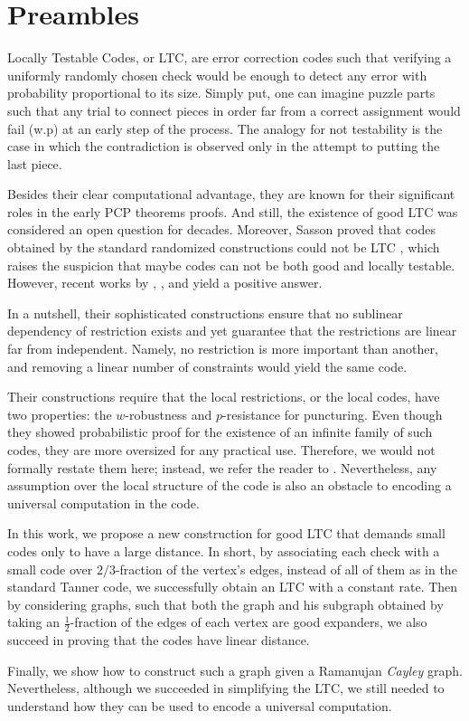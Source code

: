 \section{Preambles}

Locally Testable Codes, or LTC, are error correction codes such that verifying a uniformly randomly chosen check would be enough to detect any error with probability proportional to its size. Simply put, one can imagine puzzle parts such that any trial to connect pieces in order far from a correct assignment would fail (w.p) at an early step of the process. The analogy for not testability is the case in which the contradiction is observed only in the attempt to putting the last piece.     

Besides their clear computational advantage, they are known for their significant roles in the early PCP theorems proofs. And still, the existence of good LTC was considered an open question for decades. Moreover, Sasson proved that codes obtained by the standard randomized constructions could not be LTC \cite{Sasson}, which raises the suspicion that maybe codes can not be both good and locally testable. However, recent works by \cite{Dinur}, \cite{Pavel}, and \cite{leverrier2022quantum} yield a positive answer.

In a nutshell, their sophisticated constructions ensure that no sublinear dependency of restriction exists and yet guarantee that the restrictions are linear far from independent. Namely, no restriction is more important than another, and removing a linear number of constraints would yield the same code.  

Their constructions require that the local restrictions, or the local codes, have two properties: the $w$-robustness and $p$-resistance for puncturing. Even though they showed probabilistic proof for the existence of an infinite family of such codes, they are more oversized for any practical use. Therefore, we would not formally restate them here; instead, we refer the reader to \cite{leverrier2022quantum}. Nevertheless, any assumption over the local structure of the code is also an obstacle to encoding a universal computation in the code. 

In this work, we propose a new construction for good LTC that demands small codes only to have a large distance. In short, by associating each check with a small code over $2/3$-fraction of the vertex's edges, instead of all of them as in the standard Tanner code, we successfully obtain an LTC with a constant rate. Then by considering graphs, such that both the graph and his subgraph obtained by taking an $\frac{1}{2}$-fraction of the edges of each vertex are good expanders, we also succeed in proving that the codes have linear distance. 

Finally, we show how to construct such a graph given a Ramanujan \emph{Cayley} graph. Nevertheless, although we succeeded in simplifying the LTC, we still needed to understand how they can be used to encode a universal computation.  


